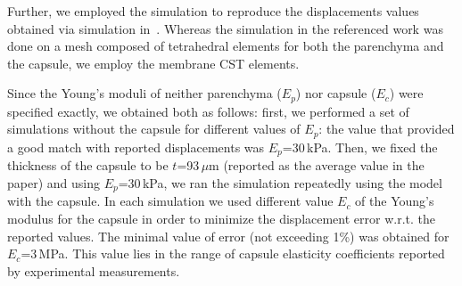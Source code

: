 Further, we employed the simulation to reproduce the displacements values obtained via simulation in~\cite{Hollenstein2006,Nava2008}.
Whereas the simulation in the referenced work was done on a mesh composed of tetrahedral elements for both the parenchyma 
and the capsule, we employ the membrane CST elements.

Since the Young's moduli of neither parenchyma ($E_p$) nor capsule ($E_c$) were specified exactly, we obtained both as follows: first, 
we performed a set of simulations without the capsule for different values of $E_p$: the value that provided a good match 
with reported displacements was $E_p$=30\,kPa. 
Then, we fixed the thickness of the capsule to be $t$=93\,$\mu$m (reported as the average value in the paper) and 
using $E_p$=30\,kPa, we ran the simulation repeatedly using the model with the capsule. In each simulation we 
used different value $E_c$ of the Young's modulus for the capsule in order to minimize the displacement error w.r.t. the 
reported values. The minimal value of error (not exceeding 1\%) was obtained for $E_c$=3\,MPa. This 
value lies in the range of capsule elasticity coefficients reported by experimental measurements.



